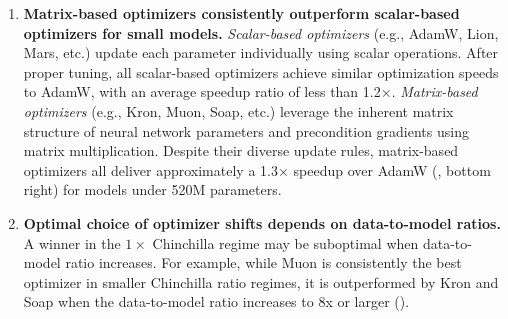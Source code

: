 \begin{enumerate}[leftmargin=*]
    \item \textbf{Matrix-based optimizers consistently outperform scalar-based optimizers for small models.} 
    \emph{Scalar-based optimizers} (e.g., AdamW, Lion, Mars, etc.) update each parameter individually using scalar operations. After proper tuning, all scalar-based optimizers achieve similar optimization speeds to AdamW, with an average speedup ratio of less than 1.2$\times$. \emph{Matrix-based optimizers} (e.g., Kron, Muon, Soap, etc.) leverage the inherent matrix structure of neural network parameters and precondition gradients using matrix multiplication. Despite their diverse update rules, matrix-based optimizers all deliver approximately a 1.3$\times$ speedup over AdamW (, bottom right) for models under 520M parameters.
    
    
    \item \textbf{Optimal choice of optimizer shifts depends on data-to-model ratios.} A winner in the $1\times$ Chinchilla regime may be suboptimal when data-to-model ratio increases. For example, while Muon is consistently the best optimizer in smaller Chinchilla ratio regimes, it is outperformed by Kron and Soap when the data-to-model ratio increases to 8x or larger (). 
\end{enumerate}

